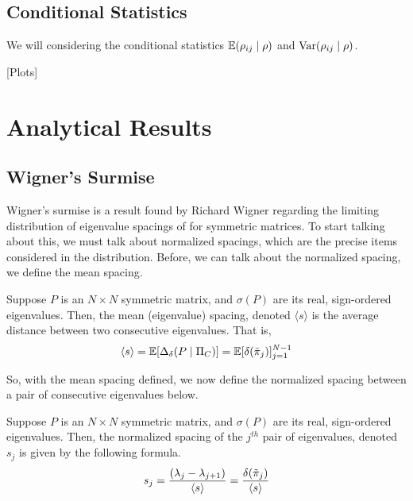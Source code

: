 \subsection{Conditional Statistics}

We will considering the conditional statistics $\mathbb{E}({\rho}_{ij} \mid \rho)$ and $\text{Var}({\rho}_{ij} \mid \rho)$.

[Plots]


\section{Analytical Results}


\subsection{Wigner's Surmise}

Wigner's surmise is a result found by Richard Wigner regarding the limiting distribution of eigenvalue spacings of for symmetric matrices. To start talking about this, we must talk about normalized spacings, which are the precise items considered in the distribution. Before, we can talk about the normalized spacing, we define the mean spacing.

\begin{definition}
Suppose $P$ is an $N \times N$ symmetric matrix, and $\sigma(P)$ are its real, sign-ordered eigenvalues. Then, the mean (eigenvalue) spacing, denoted $\langle s \rangle$ is the average distance between two consecutive eigenvalues. That is,
$$\langle s \rangle = \mathbb{E}[\Delta_\delta(P \mid \Pi_C)] = \mathbb{E}[\delta({\tilde{\pi}}_{j})]_{j = 1}^{N - 1}$$
\end{definition}

\noindent So, with the mean spacing defined, we now define the normalized spacing between a pair of consecutive eigenvalues below.

\begin{definition}
Suppose $P$ is an $N \times N$ symmetric matrix, and $\sigma(P)$ are its real, sign-ordered eigenvalues. Then, the normalized spacing of the $j^{th}$ pair of eigenvalues, denoted $s_j$ is given by the following formula.
$$s_j = \frac{(\lambda_j - \lambda_{j+1})}{\langle s \rangle} = \frac{\delta({\tilde{\pi}}_{j})}{\langle s \rangle}$$
\end{definition}

